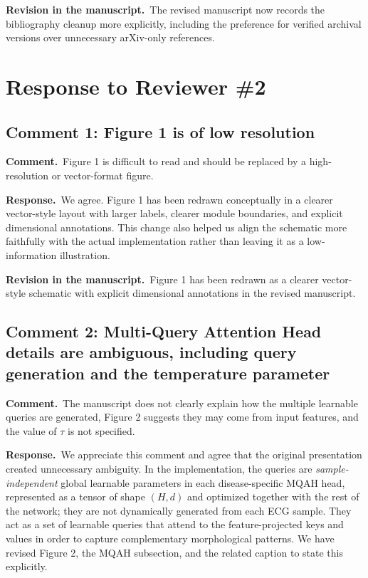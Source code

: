 \documentclass[11pt]{article}
\newcommand{\commentheader}{\textbf{Comment.}}
\newcommand{\responseheader}{\textbf{Response.}}
\newcommand{\revisionheader}{\textbf{Revision in the manuscript.}}
\begin{document}
\revisionheader\ The revised manuscript now records the bibliography cleanup more explicitly, including the preference for verified archival versions over unnecessary arXiv-only references.

\section*{Response to Reviewer \#2}

\subsection*{Comment 1: Figure 1 is of low resolution}

\commentheader\ Figure 1 is difficult to read and should be replaced by a high-resolution or vector-format figure.

\responseheader\ We agree. Figure 1 has been redrawn conceptually in a clearer vector-style layout with larger labels, clearer module boundaries, and explicit dimensional annotations. This change also helped us align the schematic more faithfully with the actual implementation rather than leaving it as a low-information illustration.

\revisionheader\ Figure 1 has been redrawn as a clearer vector-style schematic with explicit dimensional annotations in the revised manuscript.

\subsection*{Comment 2: Multi-Query Attention Head details are ambiguous, including query generation and the temperature parameter}

\commentheader\ The manuscript does not clearly explain how the multiple learnable queries are generated, Figure 2 suggests they may come from input features, and the value of $\tau$ is not specified.

\responseheader\ We appreciate this comment and agree that the original presentation created unnecessary ambiguity. In the implementation, the queries are \emph{sample-independent} global learnable parameters in each disease-specific MQAH head, represented as a tensor of shape $(H,d)$ and optimized together with the rest of the network; they are not dynamically generated from each ECG sample. They act as a set of learnable queries that attend to the feature-projected keys and values in order to capture complementary morphological patterns. We have revised Figure 2, the MQAH subsection, and the related caption to state this explicitly.
\end{document}
